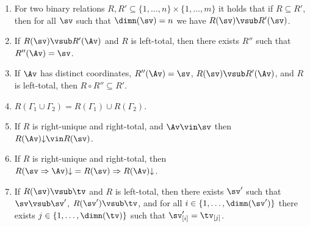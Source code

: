 \begin{enumerate}
\item For two binary relations $R,R'\subseteq\{1,\ldots,n\}\times\{1,\ldots,m\}$ it holds that if $R\subseteq R'$, then for all $\sv$ such that $\dimn(\sv)=n$ we have $R(\sv)\vsub R'(\sv)$.
\item If $R(\sv)\vsub R'(\Av)$ and $R$ is left-total, then there exists $R''$ such that $R''(\Av)=\sv$.
\item If $\Av$ has distinct coordinates, $R''(\Av)=\sv$, $R(\sv)\vsub R'(\Av)$, and $R$ is left-total, then $R\circ R''\subseteq R'$.
\item $R(\Gamma_1\cup\Gamma_2)=R(\Gamma_1)\cup R(\Gamma_2)$.
\item If $R$ is right-unique and right-total, and $\Av\vin\sv$ then $R(\Av)\mathord\downarrow\vin R(\sv)$.
\item If $R$ is right-unique and right-total, then $R(\sv\Rightarrow\Av)\mathord\downarrow=R(\sv)\Rightarrow R(\Av)\mathord\downarrow$.
\item If $R(\sv)\vsub\tv$ and $R$ is left-total, then there exists $\sv'$ such that $\sv\vsub\sv'$, $R(\sv')\vsub\tv$, and for all $i\in\{1,\ldots,\dimn(\sv')\}$ there exists $j\in\{1,\ldots,\dimn(\tv)\}$ such that $\sv'_{[i]}=\tv_{[j]}$.
\end{enumerate}

